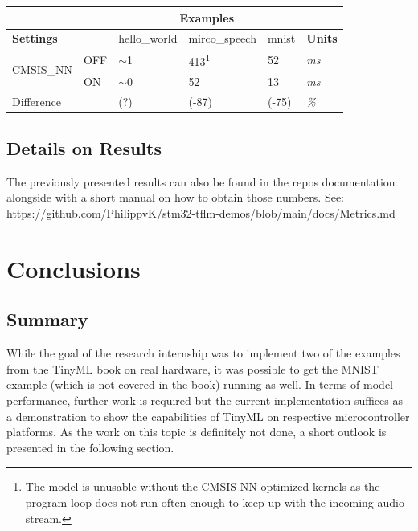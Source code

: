 \documentclass[oneside]{tum-book}
\begin{document}
\begin{table}[h]
\begin{tabular}{|l|l|l|l|l|l|}
\hline
\multicolumn{2}{|l|}{} & \multicolumn{3}{c|}{\textbf{Examples}} &\\\hline
\multicolumn{2}{|l|}{\textbf{Settings}}  & hello\_world & mirco\_speech & mnist & \textbf{Units} \\\hline
\multirow{2}{*}{CMSIS\_NN} & OFF              & $\sim$1                 & 413\footnote{The model is unusable without the CMSIS-NN optimized kernels as the program loop does not run often enough to keep up with the incoming audio stream.}                 & 52               & \textit{ms}             \\
 & ON               & $\sim$0                 & 52                       & 13               & \textit{ms}              \\\hline
\multicolumn{2}{|l|}{Difference}                   & (?)                     & (-87)                    & (-75)            & \textit{\%}           \\\hline  
\end{tabular}
\end{table}

\section{Details on Results}

The previously presented results can also be found in the repos documentation alongside with a short manual on how to obtain those numbers. See: \url{https://github.com/PhilippvK/stm32-tflm-demos/blob/main/docs/Metrics.md}

\chapter{Conclusions}

\section{Summary}

While the goal of the research internship was to implement two of the examples from the TinyML book on real hardware, it was possible to get the MNIST example (which is not covered in the book) running as well. In terms of model performance, further work is required but the current implementation suffices as a demonstration to show the capabilities of TinyML on respective microcontroller platforms. As the work on this topic is definitely not done, a short outlook is presented in the following section.
\end{document}

